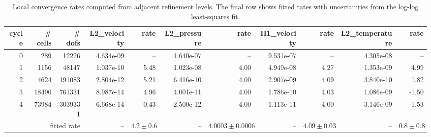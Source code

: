\begin{table}[htbp]
\centering
\begin{tabular}{|r|r|r|r|r|r|r|r|r|r|r|}
\hline
cycle & \# cells & \# dofs & L2\_velocity & rate & L2\_pressure & rate & H1\_velocity & rate & L2\_temperature & rate \\ \hline
0 & 289 & 12226 & 4.634e-09 & -- & 1.640e-07 & -- & 9.531e-07 & -- & 4.305e-08 & -- \\ \hline
1 & 1156 & 48147 & 1.037e-10 & 5.48 & 1.023e-08 & 4.00 & 4.949e-08 & 4.27 & 1.353e-09 & 4.99 \\ \hline
2 & 4624 & 191083 & 2.804e-12 & 5.21 & 6.416e-10 & 4.00 & 2.907e-09 & 4.09 & 3.840e-10 & 1.82 \\ \hline
3 & 18496 & 761331 & 8.987e-14 & 4.96 & 4.001e-11 & 4.00 & 1.786e-10 & 4.03 & 1.086e-09 & -1.50 \\ \hline
4 & 73984 & 3039331 & 6.668e-14 & 0.43 & 2.500e-12 & 4.00 & 1.113e-11 & 4.00 & 3.146e-09 & -1.53 \\ \hline
\multicolumn{3}{|r|}{fitted rate} & -- & $4.2 \pm 0.6$ & -- & $4.0003 \pm 0.0006$ & -- & $4.09 \pm 0.03$ & -- & $0.8 \pm 0.8$ \\ \hline
\end{tabular}
\caption{Local convergence rates computed from adjacent refinement levels. The final row shows fitted rates with uncertainties from the log-log least-squares fit.}
\end{table}

